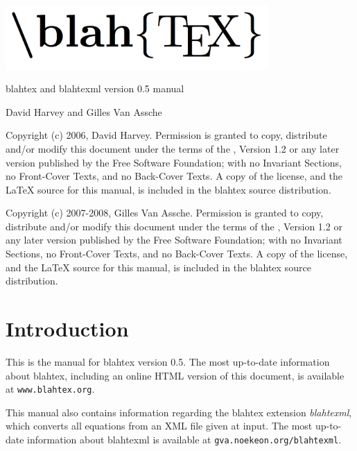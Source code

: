 \documentclass{article}
\newcommand{\blahtexversion}{0.5}
\begin{document}
\thispagestyle{empty}

\begin{center}
\includegraphics[width=10cm]{logo.png}

\vskip 1.6cm

{\Large blahtex and blahtexml version \blahtexversion{} manual}

\vskip 0.8cm

{\Large David Harvey} and {\Large Gilles Van Assche}
\end{center}

\vskip 1.6cm

{\footnotesize
Copyright (c) 2006, David Harvey. Permission is granted to copy, distribute
and/or modify this document under the terms of the
,
Version 1.2 or any later version published by the Free Software Foundation;
with no Invariant Sections, no Front-Cover Texts, and no Back-Cover Texts.
A copy of the license, and the \LaTeX{} source for this manual, is included
in the blahtex source distribution.
}

{\footnotesize
Copyright (c) 2007-2008, Gilles Van Assche. Permission is granted to copy, distribute and/or modify this document under the terms of the
,
Version 1.2 or any later version published by the Free Software Foundation;
with no Invariant Sections, no Front-Cover Texts, and no Back-Cover Texts.
A copy of the license, and the \LaTeX{} source for this manual, is included
in the blahtex source distribution.
}

\section{Introduction}

\begin{latexonly}
This is the manual for blahtex version \blahtexversion. The most up-to-date information about blahtex, including
an online HTML version of this document, is available at \texttt{www.blahtex.org}.

This manual also contains information regarding the blahtex extension \emph{blahtexml}, which converts
all equations from an XML file given at input.
The most up-to-date information about blahtexml is available at \texttt{gva.noekeon.org/blahtexml}.
\end{latexonly}
\end{document}
